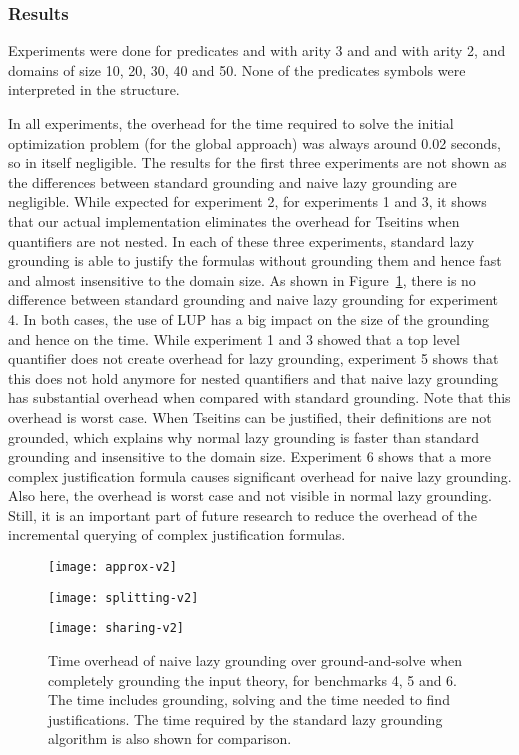 \documentclass[11pt]{article}
\theoremstyle{plain}
\theoremstyle{definition}
\theoremstyle{example_basic}
\theoremstyle{example_contd}
\theoremstyle{plain}
\newcommand{\change}[1]{#1}
\begin{document}
\subsubsection{Results}
Experiments were done \change{for predicates  and  with arity 3 and  and  with arity 2,} and domains of size 10, 20, 30, 40 and 50. \change{None of the predicates symbols were interpreted in the structure.}

In all experiments, the overhead for the time required to solve the
initial optimization problem (for the global approach) was always
around 0.02 seconds, so in itself negligible.
\change{The results for the first three experiments are not shown as
the differences between standard grounding and naive lazy grounding
are negligible. While expected for experiment 2, for experiments 1 and
3, it shows that our actual implementation eliminates the overhead
for Tseitins when quantifiers are not nested.  
In each of these three experiments, standard lazy grounding is able to
justify the formulas without grounding them and hence fast and
almost insensitive to the domain size.
As shown in Figure~\ref{overhead}, there is no difference between
standard grounding and naive lazy grounding for experiment 4. In
both cases, the use of LUP has a big impact on the size of the
grounding and hence on the time.
While experiment 1 and 3 showed that a top level quantifier does not
create overhead for lazy grounding, experiment 5 shows that this does
not hold anymore for nested quantifiers and that naive lazy grounding
has substantial overhead when compared with standard grounding. Note
that this overhead is worst case. When Tseitins can be justified,
their definitions are not grounded, which explains why normal lazy
grounding is faster than standard grounding and insensitive to the
domain size.
Experiment 6 shows that a more complex justification formula causes
significant overhead for naive lazy grounding. Also here, the overhead
is worst case and not visible in normal lazy grounding. Still, it is
an important part of future research to reduce the overhead of the
incremental querying of complex justification formulas.}

\begin{figure}
\centering
\begin{minipage}{0.32\textwidth}
\centering
\texttt{[image: approx-v2]}
\end{minipage}
\begin{minipage}{0.32\textwidth}
\centering
\texttt{[image: splitting-v2]}
\end{minipage}
\begin{minipage}{0.32\textwidth}
\centering
\texttt{[image: sharing-v2]}
\end{minipage}
\vspace{5pt}
\caption{Time overhead of \change{naive} lazy grounding over ground-and-solve when completely grounding the input theory, for benchmarks 4, 5 and 6. The time includes grounding, solving and the time needed to find justifications. The time required by the standard lazy grounding algorithm is also shown for comparison.}
\label{overhead}
\end{figure} 
\end{document}
